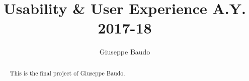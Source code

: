 \documentclass[a4paper,10pt]{report}
\title{Usability & User Experience A.Y. 2017-18}
\author{Giuseppe Baudo}
\begin{document}
\maketitle

\begin{abstract}
This is the final project of Giuseppe Baudo. 
\end{abstract}
\end{document}

